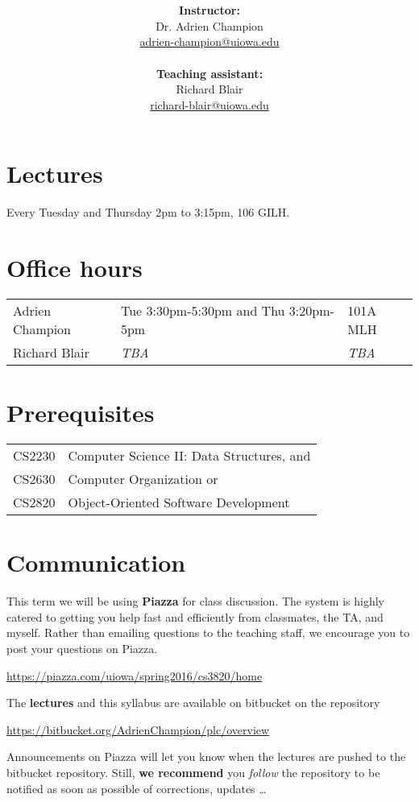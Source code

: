 \documentclass[10pt]{article}
\title{
  \articleTitle
}
\author{
  \begin{minipage}{.5\textwidth}
    \centering
    \textbf{Instructor:}\\
    Dr. Adrien Champion\\
    \href{mailto:adrien-champion@uiowa.edu}{adrien-champion@uiowa.edu}\\[2pt]
  \end{minipage}
  \begin{minipage}{.5\textwidth}
    \centering
    \textbf{Teaching assistant:}\\
    Richard Blair\\
    \href{mailto:richard-blair@uiowa.edu}{richard-blair@uiowa.edu}
  \end{minipage}
}
\date{}
\newcommand{\ita}[1]{\textit{#1}}
\newcommand{\tba}{\ita{TBA}\xspace}
\begin{document}
\maketitle

\section*{Lectures}
Every Tuesday and Thursday 2pm to 3:15pm, 106 GILH.


\section*{Office hours}
\begin{tabular}{l | l l}
  Adrien Champion & Tue 3:30pm-5:30pm and Thu 3:20pm-5pm & 101A MLH \\
  Richard Blair & \tba & \tba \\
\end{tabular}


\section*{Prerequisites}
\begin{tabular}{l l}
  CS$2230$ & Computer Science II: Data Structures, and \\
  CS$2630$ & Computer Organization or \\
  CS$2820$ & Object-Oriented Software Development
\end{tabular}


\section*{Communication}

This term we will be using \textbf{Piazza} for class discussion. The system is
highly catered to getting you help fast and efficiently from classmates, the
TA, and myself. Rather than emailing questions to the teaching staff, we
encourage you to post your questions on Piazza.

\centerline{
  \url{https://piazza.com/uiowa/spring2016/cs3820/home}
}

\noindent
The \textbf{lectures} and this syllabus are available on bitbucket on the
repository

\centerline{
  \url{https://bitbucket.org/AdrienChampion/plc/overview}
}

\noindent
Announcements on Piazza will let you know when the lectures are pushed to the
bitbucket repository. Still, \textbf{we recommend} you \ita{follow} the
repository to be notified as soon as possible of corrections, updates \ldots
\end{document}
